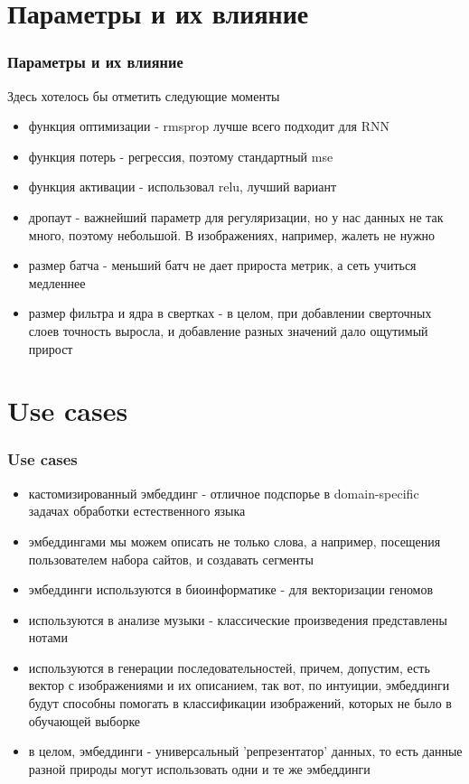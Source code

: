 \documentclass{beamer}
\begin{document}
\section{Параметры и их влияние}
\begin{frame}
  \frametitle{Параметры и их влияние}
Здесь хотелось бы отметить следующие моменты
\begin{itemize}
\item функция оптимизации - rmsprop лучше всего подходит для RNN
\item функция потерь - регрессия, поэтому стандартный mse
\item функция активации - использовал relu, лучший вариант
\item дропаут - важнейший параметр для регуляризации, но у нас данных не так
  много, поэтому небольшой. В изображениях, например, жалеть не нужно
\item размер батча - меньший батч не дает прироста метрик, а сеть учиться
  медленнее
\item размер фильтра и ядра в свертках - в целом, при добавлении сверточных
  слоев точность выросла, и добавление разных значений дало ощутимый прирост
\end{itemize}
\end{frame}

\section{Use cases}
\begin{frame}
  \frametitle{Use cases}
\begin{itemize}
\item кастомизированный эмбеддинг - отличное подспорье в domain-specific задачах
  обработки естественного языка 
\item эмбеддингами мы можем описать не только слова, а например, посещения
  пользователем набора сайтов, и создавать сегменты
\item эмбеддинги используются в биоинформатике - для векторизации геномов
\item используются в анализе музыки - классические произведения представлены нотами
\item используются в генерации последовательностей, причем, допустим, есть
  вектор с изображениями и их описанием, так вот, по интуиции,
  эмбеддинги будут способны помогать в классификации изображений, которых не
  было в обучающей выборке
\item в целом, эмбеддинги - универсальный 'репрезентатор' данных, то есть данные
  разной природы могут использовать одни и те же эмбеддинги
\end{itemize}
\end{frame}

\end{document}
